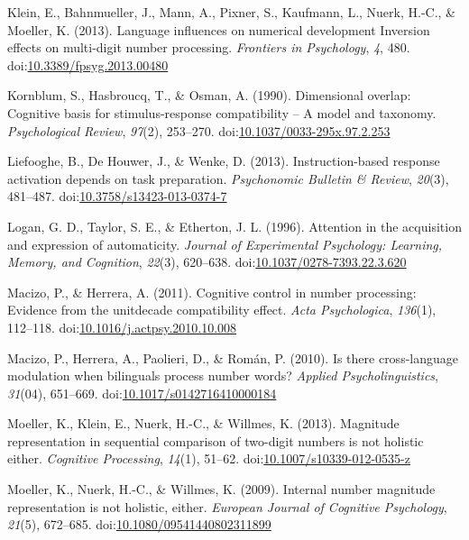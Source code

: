 \documentclass[english,man]{apa6}
\theoremstyle{definition}
\theoremstyle{definition}
\theoremstyle{definition}
\theoremstyle{remark}
\begin{document}
\hypertarget{ref-klein2013}{}
Klein, E., Bahnmueller, J., Mann, A., Pixner, S., Kaufmann, L., Nuerk,
H.-C., \& Moeller, K. (2013). Language influences on numerical
development Inversion effects on multi-digit number processing.
\emph{Frontiers in Psychology}, \emph{4}, 480.
doi:\href{https://doi.org/10.3389/fpsyg.2013.00480}{10.3389/fpsyg.2013.00480}

\hypertarget{ref-kornblum1990}{}
Kornblum, S., Hasbroucq, T., \& Osman, A. (1990). Dimensional overlap:
Cognitive basis for stimulus-response compatibility -- A model and
taxonomy. \emph{Psychological Review}, \emph{97}(2), 253--270.
doi:\href{https://doi.org/10.1037/0033-295x.97.2.253}{10.1037/0033-295x.97.2.253}

\hypertarget{ref-liefooghe2013}{}
Liefooghe, B., De Houwer, J., \& Wenke, D. (2013). Instruction-based
response activation depends on task preparation. \emph{Psychonomic
Bulletin \& Review}, \emph{20}(3), 481--487.
doi:\href{https://doi.org/10.3758/s13423-013-0374-7}{10.3758/s13423-013-0374-7}

\hypertarget{ref-logan1996}{}
Logan, G. D., Taylor, S. E., \& Etherton, J. L. (1996). Attention in the
acquisition and expression of automaticity. \emph{Journal of
Experimental Psychology: Learning, Memory, and Cognition}, \emph{22}(3),
620--638.
doi:\href{https://doi.org/10.1037/0278-7393.22.3.620}{10.1037/0278-7393.22.3.620}

\hypertarget{ref-macizo2011}{}
Macizo, P., \& Herrera, A. (2011). Cognitive control in number
processing: Evidence from the unitdecade compatibility effect.
\emph{Acta Psychologica}, \emph{136}(1), 112--118.
doi:\href{https://doi.org/10.1016/j.actpsy.2010.10.008}{10.1016/j.actpsy.2010.10.008}

\hypertarget{ref-macizo2010}{}
Macizo, P., Herrera, A., Paolieri, D., \& Román, P. (2010). Is there
cross-language modulation when bilinguals process number words?
\emph{Applied Psycholinguistics}, \emph{31}(04), 651--669.
doi:\href{https://doi.org/10.1017/s0142716410000184}{10.1017/s0142716410000184}

\hypertarget{ref-moeller2013}{}
Moeller, K., Klein, E., Nuerk, H.-C., \& Willmes, K. (2013). Magnitude
representation in sequential comparison of two-digit numbers is not
holistic either. \emph{Cognitive Processing}, \emph{14}(1), 51--62.
doi:\href{https://doi.org/10.1007/s10339-012-0535-z}{10.1007/s10339-012-0535-z}

\hypertarget{ref-moeller2009}{}
Moeller, K., Nuerk, H.-C., \& Willmes, K. (2009). Internal number
magnitude representation is not holistic, either. \emph{European Journal
of Cognitive Psychology}, \emph{21}(5), 672--685.
doi:\href{https://doi.org/10.1080/09541440802311899}{10.1080/09541440802311899}
\end{document}
